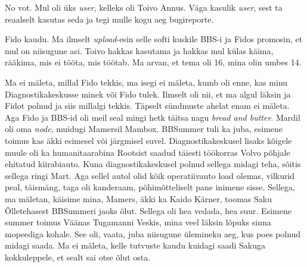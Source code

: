 
No vot. Mul oli üks \emph{user}, kelleks oli Toivo Annus. Väga kasulik \emph{user}, sest ta reaalselt kasutas seda ja tegi  mulle 
kogu aeg bugireporte.


Fido kaudu. Ma ilmselt \emph{upload}-esin selle softi kuskile BBS-i ja Fidos 
promosin, et mul on niisugune asi. Toivo hakkas kasutama ja hakkas mul külas 
käima, rääkima, mis ei tööta, mis töötab. Ma arvan, et tema oli 16, mina olin 
umbes 14. 


Ma ei mäleta, millal Fido tekkis, ma isegi ei mäleta, kumb oli enne, kas minu
 Diagnostikakeskusse minek või Fido tulek. Ilmselt 
oli nii, et ma algul läksin ja Fidot polnud ja siis millalgi tekkis. Täpselt 
sündmuste ahelat enam ei mäleta. Aga Fido ja BBS-id oli meil seal mingi hetk 
täitsa nagu \emph{bread and butter}. Mardil oli oma 
\emph{node}, muidugi Mamersil Mambox. 
BBSummer tuli ka juba, esimene toimus kas äkki esimesel või  
järgmisel suvel. Diagnostikakeskusel lisaks 
kõigele muule oli ka humanitaarabina Rootsist saadud täiesti töökorras Volvo 
põhjale ehitatud kiirabiauto. Kuna diagnostikakeskusel polnud sellega 
midagi teha, sõitis sellega ringi Mart. Aga sellel autol olid kõik  
operatiivauto load olemas, vilkurid peal, täismäng, taga oli kanderaam, 
põhimõtteliselt pane inimene sisse. Sellega, ma mäletan, käisime mina, 
Mamers, äkki ka Kaido Kärner, toomas Saku Õlletehasest BBSummeri jaoks õlut. Sellega oli hea vedada, 
hea suur. Esimene summer toimus Väänas Tugamanni Veskis, mina veel läksin 
lõpuks sinna mopeediga kohale. See oli, vaata, juba niisugune ülemineku aeg, 
kus poes polnud midagi saada. Ma ei mäleta, kelle tutvuste kaudu kuidagi saadi 
Sakuga kokkuleppele, et sealt sai otse õlut osta. 


